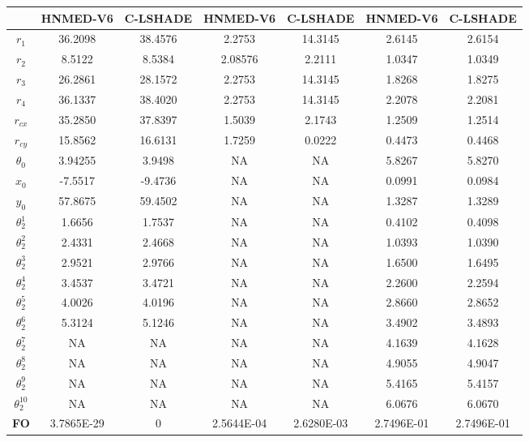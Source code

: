 \begin{table}
{\begin{tabular}{|c|c|c|c|c|c|c|}
	         & \textbf{HNMED-V6}&\textbf{C-LSHADE}&\textbf{HNMED-V6}&\textbf{C-LSHADE}&\textbf{HNMED-V6}&\textbf{C-LSHADE}  \\
		\hline                         
		$r_1$                         & 36.2098&38.4576   & 2.2753& 14.3145   & 2.6145& 2.6154   \\
		\hline
		$r_2$                          & 8.5122& 8.5384  & 2.08576&2.2111& 1.0347&  1.0349    \\
		\hline
		$r_3$                         & 26.2861& 28.1572   & 2.2753&14.3145    & 1.8268&  1.8275    \\
		\hline
		$r_4$                         & 36.1337&38.4020    & 2.2753&14.3145  & 2.2078 &  2.2081   \\
		\hline
		$r_{cx}$                        & 35.2850&37.8397    & 1.5039&2.1743   & 1.2509&  1.2514    \\
		\hline
		$r_{cy}$                      & 15.8562& 16.6131    & 1.7259& 0.0222  & 0.4473 &  0.4468   \\
		\hline
		$\theta_0$                      & 3.94255&3.9498    & NA&   NA      & 5.8267& 5.8270     \\
		\hline
		$x_0$                         & -7.5517&-9.4736    & NA&    NA     & 0.0991&  0.0984    \\
		\hline
		$y_0$                         & 57.8675&59.4502    & NA &     NA   & 1.3287 & 1.3289    \\
		\hline
		$\theta^1_2$                     & 1.6656&1.7537     & NA&      NA   & 0.4102 &  0.4098   \\
		\hline
		$\theta^2_2$                     & 2.4331&2.4668     & NA&        NA & 1.0393 & 1.0390    \\
		\hline
		$\theta^3_2$                     & 2.9521&2.9766     & NA&NA         & 1.6500 &  1.6495   \\
		\hline
		$\theta^4_2$                     & 3.4537&3.4721     & NA & NA       & 2.2600 & 2.2594    \\
		\hline
		$\theta^5_2$                     & 4.0026&4.0196    & NA & NA       & 2.8660  &  2.8652  \\
		\hline
		$\theta^6_2$                     & 5.3124&5.1246     & NA &NA        & 3.4902 &  3.4893   \\
		\hline
		$\theta^7_2$                     & NA    &  NA   & NA & NA       & 4.1639 & 4.1628    \\
		\hline
		$\theta^8_2$                     & NA    &  NA   & NA & NA       & 4.9055 &  4.9047   \\
		\hline
		$\theta^9_2$                     & NA    &   NA  & NA & NA       & 5.4165 & 5.4157    \\
		\hline
		$\theta^{10}_2$                     & NA &     NA   & NA &NA        & 6.0676 & 6.0670    \\
		\hline
		\textbf{FO}                    & 3.7865E-29 &0&2.5644E-04&2.6280E-03& 2.7496E-01& 2.7496E-01\\
		\hline
	\end{tabular}
}
\end{table}

